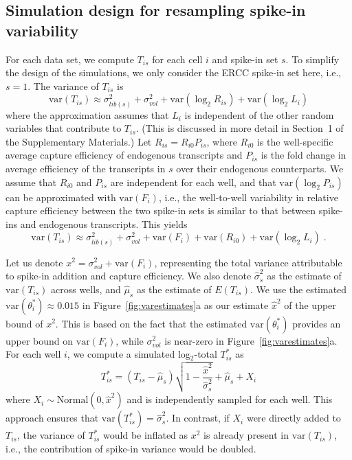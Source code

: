 \documentclass{article}
\newcommand{\suppsecmath}{1}
\newcommand\variance{\mbox{var}}
\begin{document}
\subsection*{Simulation design for resampling spike-in variability}
For each data set, we compute $T_{is}$ for each cell $i$ and spike-in set $s$.
To simplify the design of the simulations, we only consider the ERCC spike-in set here, i.e., $s=1$.
The variance of $T_{is}$ is
\[
    \variance(T_{is}) \approx \sigma^2_{lib(s)} + \sigma^2_{vol} + \variance(\log_2 R_{is}) + \variance(\log_2 L_i)
\]
where the approximation assumes that $L_i$ is independent of the other random variables that contribute to $T_{is}$.
(This is discussed in more detail in Section~\suppsecmath{} of the Supplementary Materials.)
Let $R_{is} = R_{i0}P_{is}$, where $R_{i0}$ is the well-specific average capture efficiency of endogenous transcripts and $P_{is}$ is the fold change in average efficiency of the transcripts in $s$ over their endogenous counterparts.
We assume that $R_{i0}$ and $P_{is}$ are independent for each well, and that $\variance(\log_2 P_{is})$ can be approximated with $\variance(F_i)$,
i.e., the well-to-well variability in relative capture efficiency between the two spike-in sets is similar to that between spike-ins and endogenous transcripts.
This yields
\[
    \variance(T_{is}) \approx \sigma^2_{lib(s)} + \sigma^2_{vol} + \variance(F_i) + \variance(R_{i0}) + \variance(\log_2 L_i) \;.
\]


Let us denote $x^2 = \sigma^2_{vol} + \variance(F_i)$, representing the total variance attributable to spike-in addition and capture efficiency.
We also denote $\hat\sigma^2_s$ as the estimate of $\variance(T_{is})$ across wells, and $\hat\mu_s$ as the estimate of $E(T_{is})$.
We use the estimated $\variance(\theta^*_i) \approx 0.015$ in Figure~\ref{fig:varestimates}a as our estimate $\hat{x}^2$ of the upper bound of $x^2$.
This is based on the fact that the estimated $\variance(\theta^*_i)$ provides an upper bound on $\variance(F_i)$, while $\sigma^2_{vol}$ is near-zero in Figure~\ref{fig:varestimates}a.
For each well $i$, we compute a simulated log$_2$-total $T^*_{is}$ as
\[
    T^*_{is} = (T_{is} - \hat\mu_s)\sqrt{1-\frac{ \hat{x}^2}{\hat\sigma^2_s}} + \hat\mu_s + X_i
\]
where $X_i \sim \mbox{Normal}(0, \hat{x}^2)$ and is independently sampled for each well.
This approach ensures that $\variance(T^*_{is}) = \hat\sigma^2_s$.
In contrast, if $X_i$ were directly added to $T_{is}$, the variance of $T^*_{is}$ would be inflated as $x^2$ is already present in $\variance(T_{is})$, i.e., the contribution of spike-in variance would be doubled.
\end{document}

